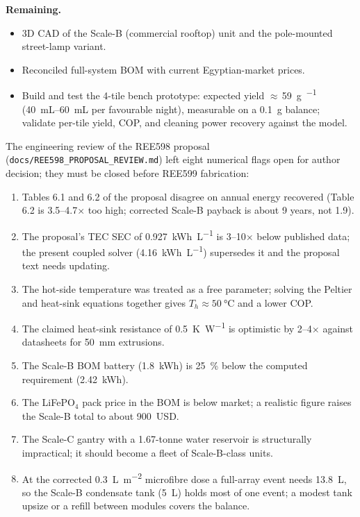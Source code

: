 \documentclass[11pt,a4paper]{article}
\begin{document}
\textbf{Remaining.}
\begin{itemize}
  \item 3D CAD of the Scale-B (commercial rooftop) unit and the
        pole-mounted street-lamp variant.
  \item Reconciled full-system BOM with current Egyptian-market prices.
  \item Build and test the 4-tile bench prototype: expected yield
        $\approx$\,\SI{59}{\gram\per\dy}
        (\SIrange{40}{60}{\milli\liter} per favourable night),
        measurable on a \SI{0.1}{\gram} balance; validate per-tile
        yield, COP, and cleaning power recovery against the model.
\end{itemize}

The engineering review of the REE598 proposal
(\texttt{docs/REE598\_PROPOSAL\_REVIEW.md}) left eight numerical flags
open for author decision; they must be closed before REE599
fabrication:

\begin{enumerate}
  \item Tables 6.1 and 6.2 of the proposal disagree on annual energy
        recovered (Table 6.2 is 3.5--4.7$\times$ too high; corrected
        Scale-B payback is about 9 years, not 1.9).
  \item The proposal's TEC SEC of \SI{0.927}{\kWh\per\liter} is 3--10$\times$
        below published data; the present coupled solver
        (\SI{4.16}{\kWh\per\liter}) supersedes it and the proposal text
        needs updating.
  \item The hot-side temperature was treated as a free parameter; solving
        the Peltier and heat-sink equations together gives
        $T_h \approx \SI{50}{\degreeCelsius}$ and a lower COP.
  \item The claimed heat-sink resistance of \SI{0.5}{\kelvin\per\watt}
        is optimistic by 2--4$\times$ against datasheets for
        \SI{50}{\milli\meter} extrusions.
  \item The Scale-B BOM battery (\SI{1.8}{\kWh}) is \SI{25}{\percent}
        below the computed requirement (\SI{2.42}{\kWh}).
  \item The LiFePO$_4$ pack price in the BOM is below market; a
        realistic figure raises the Scale-B total to about \num{900}~USD.
  \item The Scale-C gantry with a 1.67-tonne water reservoir is
        structurally impractical; it should become a fleet of
        Scale-B-class units.
  \item At the corrected \SI{0.3}{\liter\per\square\meter} microfibre dose a
        full-array event needs \SI{13.8}{\liter}, so the Scale-B condensate
        tank (\SI{5}{\liter}) holds most of one event; a modest tank upsize or
        a refill between modules covers the balance.
\end{enumerate}
\end{document}
